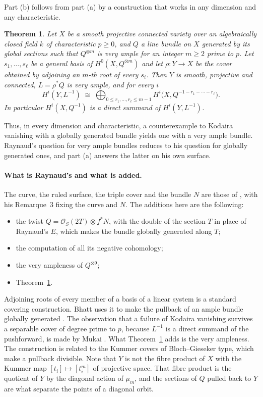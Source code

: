 \documentclass[11pt,a4paper]{article}
\theoremstyle{plain}
\newtheorem{theorem}{Theorem}
\theoremstyle{remark}
\newcommand{\OO}{\mathcal O}
\begin{document}
Part (b) follows from part (a) by a construction that works in any dimension and any characteristic.

\begin{theorem}\label{thm:roots}
Let $X$ be a smooth projective connected variety over an algebraically closed field $k$ of characteristic $p\ge0$, and
$Q$ a line bundle on $X$ generated by its global sections such that $Q^{\otimes m}$ is very ample for an integer $m\ge2$
prime to $p$. Let $s_1,\dots,s_\ell$ be a general basis of $H^0(X,Q^{\otimes m})$ and let $\rho:Y\to X$ be the cover
obtained by adjoining an $m$-th root of every $s_i$. Then $Y$ is smooth, projective and connected, $L=\rho^*Q$ is very
ample, and for every $i$
\[
 H^i(Y,L^{-1})\;\cong\;\bigoplus_{0\le r_1,\dots,r_\ell\le m-1} H^i\bigl(X,Q^{-1-r_1-\cdots-r_\ell}\bigr).
\]
In particular $H^i(X,Q^{-1})$ is a direct summand of $H^i(Y,L^{-1})$.
\end{theorem}

Thus, in every dimension and characteristic, a counterexample to Kodaira vanishing with a globally generated bundle
yields one with a very ample bundle. Raynaud's question for very ample bundles reduces to his question for globally
generated ones, and part (a) answers the latter on his own surface.

\paragraph{What is Raynaud's and what is added.} The curve, the ruled surface, the triple cover and the bundle $N$ are
those of \cite[\S\S1--3]{Raynaud}, with his Remarque~3 fixing the curve and $N$. The additions here are the following:
\begin{itemize}
\item the twist $Q=\OO_S(2T)\otimes f^*N$, with the double of the section $T$ in place of Raynaud's $E$, which makes the
bundle globally generated along $T$;
\item the computation of all its negative cohomology;
\item the very ampleness of $Q^{\otimes 9}$;
\item Theorem~\ref{thm:roots}.
\end{itemize}
Adjoining roots of every member of a basis of a linear system is a standard covering construction. Bhatt uses it to
make the pullback of an ample bundle globally generated \cite[proof of Proposition~7.2, p.~1771]{Bhatt}. The observation
that a failure of Kodaira vanishing survives a separable cover of degree prime to $p$, because $L^{-1}$ is a direct
summand of the pushforward, is made by Mukai \cite[p.~2]{Mukai}. What Theorem~\ref{thm:roots} adds is the very
ampleness. The construction is related to the Kummer covers of Bloch--Gieseker type, which make a pullback divisible.
Note that $Y$ is not the fibre product of $X$ with the Kummer map $[t_i]\mapsto[t_i^m]$ of projective space. That fibre
product is the quotient of $Y$ by the diagonal action of $\mu_m$, and the sections of $Q$ pulled back to $Y$ are what
separate the points of a diagonal orbit.
\end{document}
